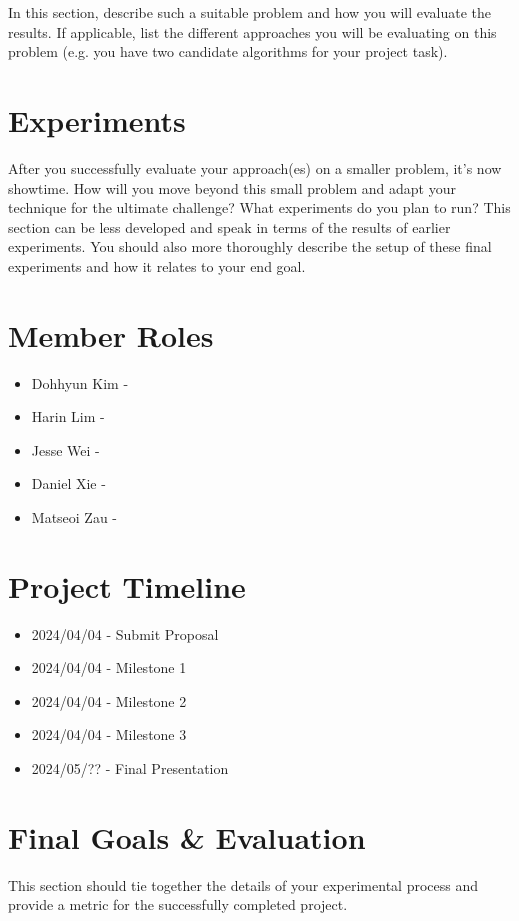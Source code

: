 \documentclass{article}
\begin{document}
In this section, describe such a suitable problem and how you will evaluate the results. If applicable, list the different approaches you will be evaluating on this problem (e.g. you have two candidate algorithms for your project task).

\section{Experiments}

After you successfully evaluate your approach(es) on a smaller problem, it's now showtime. How will you move beyond this small problem and adapt your technique for the ultimate challenge? What experiments do you plan to run? This section can be less developed and speak in terms of the results of earlier experiments. You should also more thoroughly describe the setup of these final experiments and how it relates to your end goal.

\section{Member Roles}

\begin{itemize}
\item Dohhyun Kim - 
\item Harin Lim - 
\item Jesse Wei - 
\item Daniel Xie - 
\item Matseoi Zau - 
\end{itemize}


\section{Project Timeline}

\begin{itemize}
\item 2024/04/04 - Submit Proposal 
\item 2024/04/04 - Milestone 1 
\item 2024/04/04 - Milestone 2  
\item 2024/04/04 - Milestone 3  
\item 2024/05/?? - Final Presentation 
\end{itemize}
\section{Final Goals \& Evaluation}

This section should tie together the details of your experimental process and provide a metric for the successfully completed project.
\end{document}

